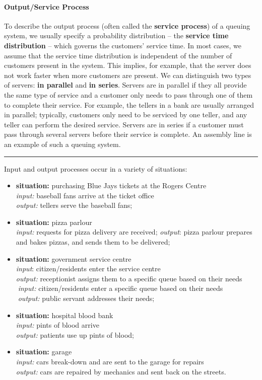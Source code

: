 \paragraph{Output/Service Process}
To describe the output process (often called the \textbf{service process}) of a queuing system, we usually specify a probability distribution -- the \textbf{service time distribution} -- which governs the customers' service time. \newpage\noindent In most cases, we assume that the service time distribution is independent of the number of customers present in the system. This implies, for example, that the server does not work faster when more customers are present. \newl We can distinguish two types of servers: \textbf{in parallel} and \textbf{in series}. Servers are in parallel if they all provide the same type of service and a customer only needs to pass through one of them to complete their service. For example, the tellers in a bank are usually arranged in parallel; typically, customers only need to be serviced by one teller, and any teller can perform the desired service. Servers are in series if a customer must pass through several servers before their service is complete. An assembly line is an example of such a queuing system.
\begin{center}
    \rule{0.5\textwidth}{.4pt}
\end{center}
Input and output processes occur in a variety of situations:
\begin{itemize}[noitemsep]
\item \textbf{situation:} purchasing Blue Jays tickets at the Rogers Centre\\ \textit{input:} baseball fans arrive at the ticket office\\ \textit{output:} tellers serve the baseball fans;
\item \textbf{situation:} pizza parlour \\ \textit{input:} requests for pizza delivery are received; \textit{output}: pizza parlour prepares and bakes pizzas, and sends them to be delivered; 
\item \textbf{situation:} government service centre\\ \textit{input}: citizen/residents enter the service centre \\ \textit{output:} receptionist assigns them to a specific queue based on their needs\\
\textcolor{white}{.}\qquad \textit{input:} citizen/residents enter a specific queue based on their needs \\ \textcolor{white}{.}\qquad \textit{output:} public servant addresses their needs;
\item \textbf{situation:} hospital blood bank\\ \textit{input:} pints of blood arrive\\ \textit{output:} patients use up pints of blood;
\item \textbf{situation:} garage\\ \textit{input:} cars break-down and are sent to the garage for repairs\\ \textit{output:} cars are repaired by mechanics and sent back on the streets.
\end{itemize}

